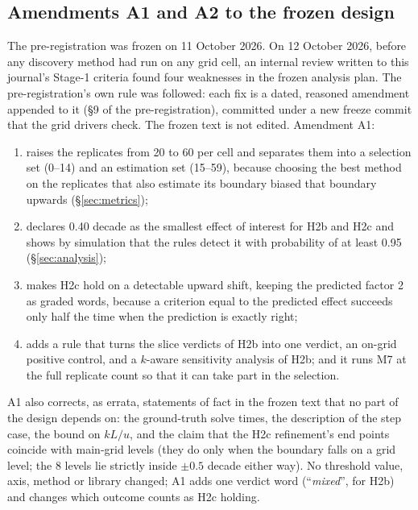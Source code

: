 \documentclass[11pt]{article}
\newcommand{\verdict}[1]{``\textit{#1}''}
\begin{document}
\subsection{Amendments A1 and A2 to the frozen design}
\label{sec:amend}
The pre-registration was frozen on 11 October 2026. On 12 October 2026, before any
discovery method had run on any grid cell, an internal review written to this journal's
Stage-1 criteria found four weaknesses in the frozen analysis plan. The pre-registration's
own rule was followed: each fix is a dated, reasoned amendment appended to it (\S9 of the
pre-registration), committed under a new freeze commit that the grid drivers check. The
frozen text is not edited. Amendment A1:
\begin{enumerate}
\item raises the replicates from 20 to 60 per cell and separates them into a selection set
(0--14) and an estimation set (15--59), because choosing the best method on the replicates
that also estimate its boundary biased that boundary upwards (\S\ref{sec:metrics});
\item declares 0.40 decade as the smallest effect of interest for H2b and H2c and shows by
simulation that the rules detect it with probability of at least 0.95 (\S\ref{sec:analysis});
\item makes H2c hold on a detectable upward shift, keeping the predicted factor 2 as graded
words, because a criterion equal to the predicted effect succeeds only half the time when
the prediction is exactly right;
\item adds a rule that turns the slice verdicts of H2b into one verdict, an on-grid
positive control, and a $k$-aware sensitivity analysis of H2b; and it runs M7 at the full
replicate count so that it can take part in the selection.
\end{enumerate}
A1 also corrects, as errata, statements of fact in the frozen text that no part of the design
depends on: the ground-truth solve times, the description of the step case, the bound on
$kL/u$, and the claim that the H2c refinement's end points coincide with main-grid levels
(they do only when the boundary falls on a grid level; the 8 levels lie strictly inside
$\pm0.5$ decade either way). No threshold value, axis, method or library changed; A1 adds
one verdict word (\verdict{mixed}, for H2b) and changes which outcome counts as H2c
holding.
\end{document}
